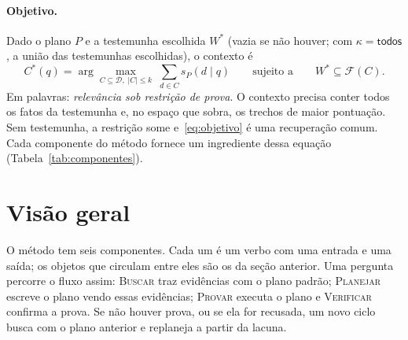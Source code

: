 \documentclass[11pt]{article}
\theoremstyle{definition}
\theoremstyle{plain}
\newcommand{\op}[1]{\textsc{#1}}
\newcommand{\D}{\mathcal{D}}          %
\newcommand{\F}{\mathcal{F}}          %
\newcommand{\todos}{\textsf{todos}}
\begin{document}
\paragraph{Objetivo.}
Dado o plano $P$ e a testemunha escolhida $W^\ast$ (vazia se não houver; com
$\kappa=\todos$, a união das testemunhas escolhidas), o contexto é
\begin{equation}
\label{eq:objetivo}
C^\ast(q)=\arg\max_{C\subseteq\D,\;|C|\le k}\;\sum_{d\in C}s_P(d\mid q)
\qquad\text{sujeito a}\qquad W^\ast\subseteq\F(C).
\end{equation}
Em palavras: \emph{relevância sob restrição de prova}. O contexto precisa
conter todos os fatos da testemunha e, no espaço que sobra, os trechos de
maior pontuação. Sem testemunha, a restrição some e~\eqref{eq:objetivo} é uma
recuperação comum. Cada componente do método fornece um ingrediente dessa
equação (Tabela~\ref{tab:componentes}).

\section{Visão geral}

O método tem seis componentes. Cada um é um verbo com uma entrada e uma saída;
os objetos que circulam entre eles são os da seção anterior. Uma pergunta
percorre o fluxo assim: \op{Buscar} traz evidências com o plano padrão;
\op{Planejar} escreve o plano vendo essas evidências; \op{Provar} executa o
plano e \op{Verificar} confirma a prova. Se não houver prova, ou se ela for
recusada, um novo ciclo busca com o plano anterior e replaneja a partir da
lacuna.
\end{document}
